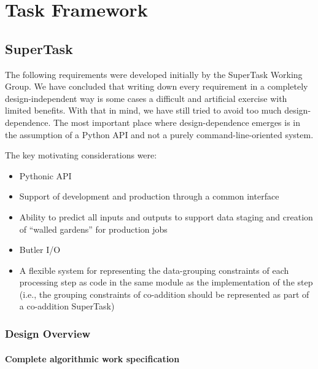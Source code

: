 \documentclass[SE,toc,lsstdraft]{lsstdoc}
\begin{document}
\section{Task Framework}

\subsection{SuperTask}

The following requirements were developed initially by the SuperTask Working Group. We have concluded that writing down every requirement in a completely design-independent way is some cases a difficult and artificial exercise with limited benefits. With that in mind, we have still tried to avoid too much design-dependence. The most important place where design-dependence emerges is in the assumption of a Python API and not a purely command-line-oriented system.

The key motivating considerations were:

    \begin{itemize}
\item
Pythonic API

\item
Support of development and production through a common interface

\item
Ability to predict all inputs and outputs to support data staging and creation of “walled gardens” for production jobs

\item
Butler I/O

\item
A flexible system for representing the data-grouping constraints of each processing step as code in the same module as the implementation of the step (i.e., the grouping constraints of co-addition should be represented as part of a co-addition SuperTask)

    \end{itemize}

\subsubsection{Design Overview}

\paragraph{Complete algorithmic work specification}\hfill  %
\end{document}

